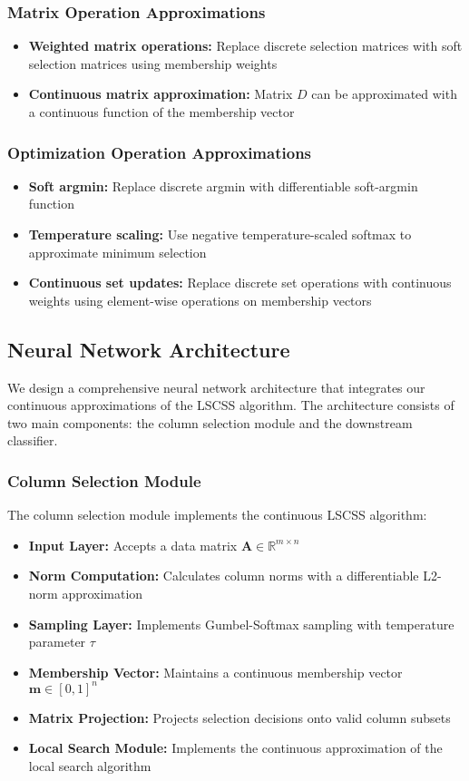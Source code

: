 \documentclass{article}
\begin{document}
\subsubsection{Matrix Operation Approximations}
\begin{itemize}
    \item \textbf{Weighted matrix operations:} Replace discrete selection matrices with soft selection matrices using membership weights
    \item \textbf{Continuous matrix approximation:} Matrix $D$ can be approximated with a continuous function of the membership vector
\end{itemize}

\subsubsection{Optimization Operation Approximations}
\begin{itemize}
    \item \textbf{Soft argmin:} Replace discrete argmin with differentiable soft-argmin function
    \item \textbf{Temperature scaling:} Use negative temperature-scaled softmax to approximate minimum selection
    \item \textbf{Continuous set updates:} Replace discrete set operations with continuous weights using element-wise operations on membership vectors
\end{itemize}

\subsection{Neural Network Architecture}
We design a comprehensive neural network architecture that integrates our continuous approximations of the LSCSS algorithm. The architecture consists of two main components: the column selection module and the downstream classifier.

\subsubsection{Column Selection Module}
The column selection module implements the continuous LSCSS algorithm:

\begin{itemize}
    \item \textbf{Input Layer:} Accepts a data matrix $\mathbf{A} \in \mathbb{R}^{m \times n}$
    \item \textbf{Norm Computation:} Calculates column norms with a differentiable L2-norm approximation
    \item \textbf{Sampling Layer:} Implements Gumbel-Softmax sampling with temperature parameter $\tau$
    \item \textbf{Membership Vector:} Maintains a continuous membership vector $\mathbf{m} \in [0,1]^n$
    \item \textbf{Matrix Projection:} Projects selection decisions onto valid column subsets
    \item \textbf{Local Search Module:} Implements the continuous approximation of the local search algorithm
\end{itemize}
\end{document}
